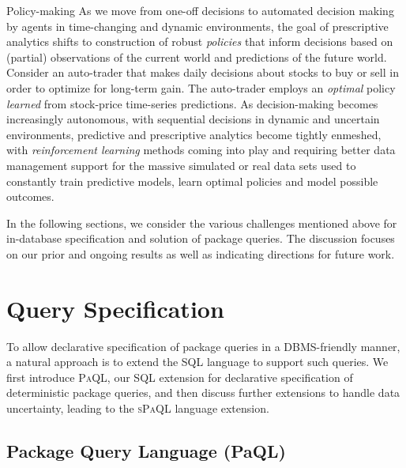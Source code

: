 \documentclass[11pt]{article}
\newcommand{\paql}{\textsc{PaQL}\xspace}
\newcommand{\spaql}{\textsc{sPaQL}\xspace}
\newcommand{\SQL}{SQL\xspace}
\newenvironment{compactdesc}%
  {\begin{description}%
        \setlength{\itemsep}{0pt}
        \setlength{\parskip}{0pt}
        \setlength{\topsep}{0pt}
        \setlength{\itemindent}{0pt}
        \setlength{\leftmargin}{0pt}}%
  {\end{description}}
\begin{document}
\begin{compactdesc}
\item[Policy-making] As we move from one-off decisions to automated decision making by agents in time-changing and dynamic environments, the goal of prescriptive analytics shifts to construction of robust \emph{policies} that inform decisions based on (partial) observations of the current world and predictions of the future world. Consider an auto-trader that makes daily decisions about stocks to buy or sell in order to optimize for long-term gain. The auto-trader  employs an \emph{optimal} policy \emph{learned} from stock-price time-series predictions. As 
decision-making becomes increasingly autonomous, with sequential decisions in dynamic and uncertain environments, predictive and prescriptive analytics become tightly enmeshed, with \textit{reinforcement learning} methods coming into play and requiring better data management support for the massive simulated or real data sets used to constantly train predictive models, learn optimal policies and model possible outcomes.
\end{compactdesc}

In the following sections, we consider the various challenges mentioned above for in-database specification and solution of package queries. The discussion focuses on our prior and ongoing results as well as indicating directions for future work.


\section{Query Specification} 
    \label{sec:specification}
      
     
     To allow declarative specification of package queries in a DBMS-friendly manner, a natural approach is to extend the \SQL language to support such queries. We first introduce \paql, our \SQL extension for declarative specification of deterministic package queries, and then discuss further extensions to handle data uncertainty, leading to the \spaql language extension.
     
\subsection{Package Query Language (PaQL)}\label{sec:paql}
\end{document}
